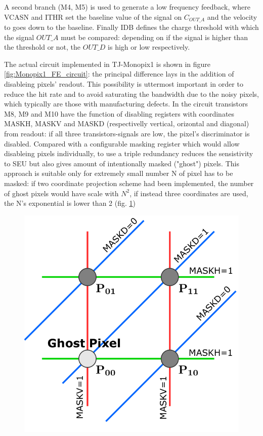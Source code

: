             A second branch (M4, M5) is used to generate a low frequency feedback, where VCASN and ITHR set the baseline value of the signal on $C_{OUT\_A}$ and the velocity to goes down to the baseline.
            Finally IDB defines the charge threshold with which the signal $OUT\_A$ must be compared: depending on if the signal is higher than the threshold or not, the $OUT\_D$ is high or low respectively.

    
            The actual circuit implemented in TJ-Monopix1 is shown in figure \ref{fig:Monopix1_FE_circuit}: the principal difference lays in the addition of disableing pixels' readout. This possibility is uttermost important in order to reduce the hit rate and to avoid saturating the bandwidth due to the noisy pixels, which typically are those with manufacturing defects.
            In the circuit transistors M8, M9 and M10 have the function of disabling registers with coordinates MASKH, MASKV and MASKD (respectivelly vertical, orizontal and diagonal) from readout: if all three transistors-signals are low, the pixel's discriminator is disabled. 
            Compared with a configurable masking register which would allow disableing pixels individually, to use a triple redundancy reduces the sensistivity to SEU but also gives amount of intentionally masked ("ghost") pixels.
            This approach is suitable only for extremely small number N of pixel has to be masked: if two coordinate projection scheme had been implemented, the number of ghost pixels would have scale with $N^2$, if instead three coordinates are used, the N's exponential is lower than 2 (fig. \ref{fig:masking_scheme})
            \begin{figure}[h!]
                \centering
                \includegraphics[width=.3\linewidth]{figures/Monopix1/masking_scheme.png}
                \caption{}
                \label{fig:masking_scheme}
            \end{figure}

